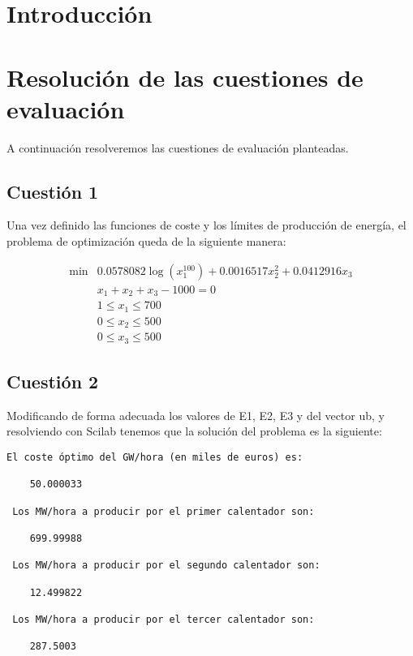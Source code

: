 \documentclass[12pt,a4paper,twoside,openright,titlepage,final]{article}
\author{José Ignacio Escribano}
\title{}
\begin{document}
\setcounter{page}{1}


\listoffigures
\thispagestyle{empty}
\newpage

\listoftables
\thispagestyle{empty}
\newpage

\tableofcontents
\thispagestyle{empty}
\newpage


\setcounter{page}{1}

\section{Introducción}



\section{Resolución de las cuestiones de evaluación}

A continuación resolveremos las cuestiones de evaluación planteadas.

\subsection{Cuestión 1}

Una vez definido las funciones de coste y los límites de producción de energía, el problema de optimización queda de la siguiente manera:

\begin{align*}
\min & 0.0578082\log(x_1^{100}) + 0.0016517x_2^2 + 0.0412916x_3\\
     & x_1 + x_2 + x_3 - 1000 = 0 \\
     & 1 \leq x_1 \leq 700 \\
     & 0 \leq x_2 \leq 500 \\
     & 0 \leq x_3 \leq 500
\end{align*}

\subsection{Cuestión 2}

Modificando de forma adecuada los valores de E1, E2, E3 y del vector ub, y resolviendo con Scilab tenemos que la solución del problema es la siguiente:

\begin{verbatim}
El coste óptimo del GW/hora (en miles de euros) es:   
 
    50.000033  
 
 Los MW/hora a producir por el primer calentador son:   
 
    699.99988  
 
 Los MW/hora a producir por el segundo calentador son:   
 
    12.499822  
 
 Los MW/hora a producir por el tercer calentador son:   
 
    287.5003  
\end{verbatim}
\end{document}
